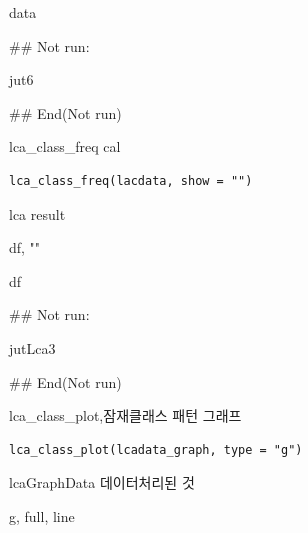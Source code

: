 \documentclass[a4paper]{book}
\begin{document}
%
\begin{Value}
data
\end{Value}
%
\begin{Examples}
\begin{ExampleCode}
## Not run: 

jut6 %

## End(Not run)
\end{ExampleCode}
\end{Examples}
%
\begin{Description}
lca\_class\_freq cal
\end{Description}
%
\begin{Usage}
\begin{verbatim}
lca_class_freq(lacdata, show = "")
\end{verbatim}
\end{Usage}
%
\begin{Arguments}
\begin{ldescription}
\item[\code{lacdata}] lca result

\item[\code{show}] df, ""
\end{ldescription}
\end{Arguments}
%
\begin{Value}
df
\end{Value}
%
\begin{Examples}
\begin{ExampleCode}
## Not run: 

 jutLca3 %

## End(Not run)
\end{ExampleCode}
\end{Examples}
%
\begin{Description}
lca\_class\_plot,잠재클래스 패턴 그래프
\end{Description}
%
\begin{Usage}
\begin{verbatim}
lca_class_plot(lcadata_graph, type = "g")
\end{verbatim}
\end{Usage}
%
\begin{Arguments}
\begin{ldescription}
\item[\code{lcadata\_graph}] lcaGraphData 데이터처리된 것

\item[\code{type}] g, full, line
\end{ldescription}
\end{Arguments}
\end{document}
